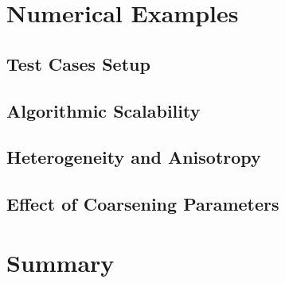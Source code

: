 \section{Numerical Examples}

\subsection{Test Cases Setup}

\subsection{Algorithmic Scalability}

\subsection{Heterogeneity and Anisotropy}

\subsection{Effect of Coarsening Parameters}

\section{Summary}